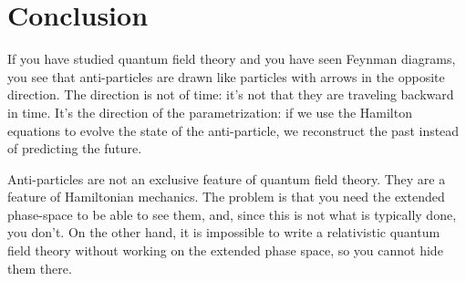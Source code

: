 \documentclass[aps,pra,10pt,floatfix,nofootinbib]{revtex4-1}
\theoremstyle{definition}
\begin{document}
\section{Conclusion}

If you have studied quantum field theory and you have seen Feynman diagrams, you see that anti-particles are drawn like particles with arrows in the opposite direction. The direction is not of time: it's not that they are traveling backward in time. It's the direction of the parametrization: if we use the Hamilton equations to evolve the state of the anti-particle, we reconstruct the past instead of predicting the future.

Anti-particles are not an exclusive feature of quantum field theory. They are a feature of Hamiltonian mechanics. The problem is that you need the extended phase-space to be able to see them, and, since this is not what is typically done, you don't. On the other hand, it is impossible to write a relativistic quantum field theory without working on the extended phase space, so you cannot hide them there.
\end{document}
